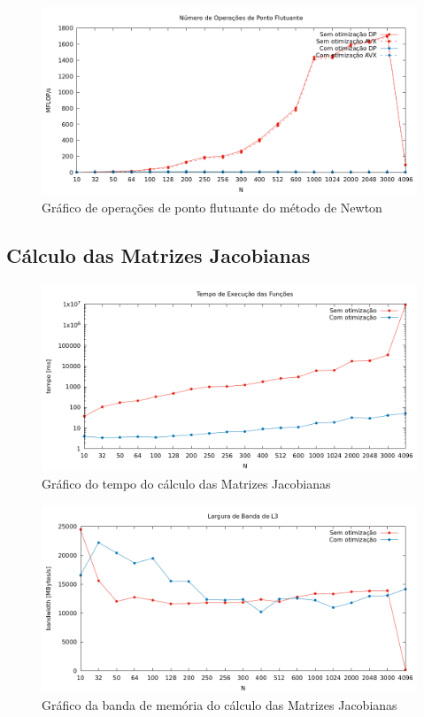 \documentclass{article}
\begin{document}
\begin{figure}[htp]
    \centering
    \includegraphics[width=12cm]{flops_dp_newton.png}
    \caption{Gráfico de operações de ponto flutuante do método de Newton}
    \label{fig:flops_newton}
\end{figure}

\newpage
\subsection{Cálculo das Matrizes Jacobianas}

\begin{figure}[htp]
    \centering
    \includegraphics[width=12cm]{tempo_jacobiana.png}
    \caption{Gráfico do tempo do cálculo das Matrizes Jacobianas}
    \label{fig:tempo_jac}
\end{figure}

\begin{figure}[htp]
    \centering
    \includegraphics[width=12cm]{l3_jacobiana.png}
    \caption{Gráfico da banda de memória do cálculo das Matrizes Jacobianas}
    \label{fig:l3_jac}
\end{figure}
\end{document}
